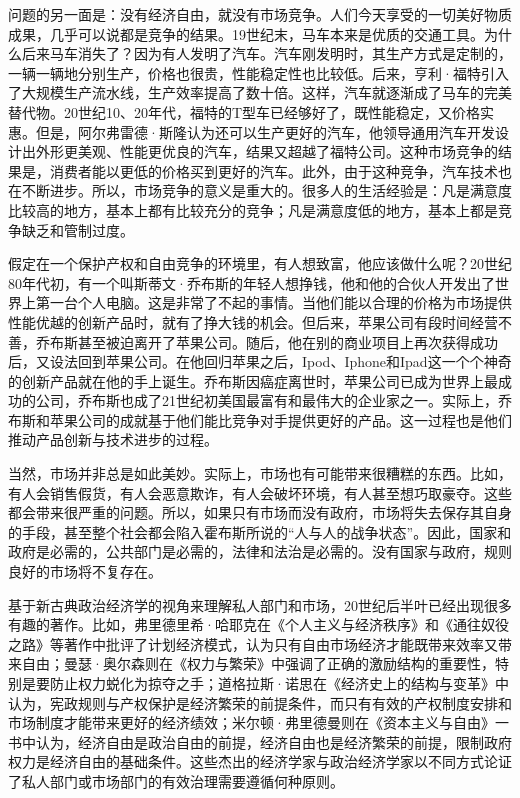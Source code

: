 问题的另一面是：没有经济自由，就没有市场竞争。人们今天享受的一切美好物质成果，几乎可以说都是竞争的结果。19世纪末，马车本来是优质的交通工具。为什么后来马车消失了？因为有人发明了汽车。汽车刚发明时，其生产方式是定制的，一辆一辆地分别生产，价格也很贵，性能稳定性也比较低。后来，亨利·福特引入了大规模生产流水线，生产效率提高了数十倍。这样，汽车就逐渐成了马车的完美替代物。20世纪10、20年代，福特的T型车已经够好了，既性能稳定，又价格实惠。但是，阿尔弗雷德·斯隆认为还可以生产更好的汽车，他领导通用汽车开发设计出外形更美观、性能更优良的汽车，结果又超越了福特公司。这种市场竞争的结果是，消费者能以更低的价格买到更好的汽车。此外，由于这种竞争，汽车技术也在不断进步。所以，市场竞争的意义是重大的。很多人的生活经验是：凡是满意度比较高的地方，基本上都有比较充分的竞争；凡是满意度低的地方，基本上都是竞争缺乏和管制过度。

假定在一个保护产权和自由竞争的环境里，有人想致富，他应该做什么呢？20世纪80年代初，有一个叫斯蒂文·乔布斯的年轻人想挣钱，他和他的合伙人开发出了世界上第一台个人电脑。这是非常了不起的事情。当他们能以合理的价格为市场提供性能优越的创新产品时，就有了挣大钱的机会。但后来，苹果公司有段时间经营不善，乔布斯甚至被迫离开了苹果公司。随后，他在别的商业项目上再次获得成功后，又设法回到苹果公司。在他回归苹果之后，Ipod、Iphone和Ipad这一个个神奇的创新产品就在他的手上诞生。乔布斯因癌症离世时，苹果公司已成为世界上最成功的公司，乔布斯也成了21世纪初美国最富有和最伟大的企业家之一。实际上，乔布斯和苹果公司的成就基于他们能比竞争对手提供更好的产品。这一过程也是他们推动产品创新与技术进步的过程。

当然，市场并非总是如此美妙。实际上，市场也有可能带来很糟糕的东西。比如，有人会销售假货，有人会恶意欺诈，有人会破坏环境，有人甚至想巧取豪夺。这些都会带来很严重的问题。所以，如果只有市场而没有政府，市场将失去保存其自身的手段，甚至整个社会都会陷入霍布斯所说的“人与人的战争状态”。因此，国家和政府是必需的，公共部门是必需的，法律和法治是必需的。没有国家与政府，规则良好的市场将不复存在。

基于新古典政治经济学的视角来理解私人部门和市场，20世纪后半叶已经出现很多有趣的著作。比如，弗里德里希·哈耶克在《个人主义与经济秩序》和《通往奴役之路》等著作中批评了计划经济模式，认为只有自由市场经济才能既带来效率又带来自由；曼瑟·奥尔森则在《权力与繁荣》中强调了正确的激励结构的重要性，特别是要防止权力蜕化为掠夺之手；道格拉斯·诺思在《经济史上的结构与变革》中认为，宪政规则与产权保护是经济繁荣的前提条件，而只有有效的产权制度安排和市场制度才能带来更好的经济绩效；米尔顿·弗里德曼则在《资本主义与自由》一书中认为，经济自由是政治自由的前提，经济自由也是经济繁荣的前提，限制政府权力是经济自由的基础条件。这些杰出的经济学家与政治经济学家以不同方式论证了私人部门或市场部门的有效治理需要遵循何种原则。

